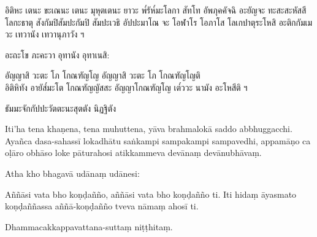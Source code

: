 \documentclass[
  babelLanguage=thai,
  final,
]{chantingbook}
\begin{document}
\clearpage

\thaiText
\markboth{\thaiTitle}{\rightmark}

อิติหะ เตนะ ขะเณนะ เตนะ มุหุตเตนะ ยาวะ พ๎รัห๎มะโลกา สัทโท อัพภุคคัจฉิ 
อะยัญจะ ทะสะสะหัสสี โลกะธาตุ สังกัมปิสัมปะกัมปิ สัมปะเวธิ 
อัปปะมาโณ จะ โอฬาโร โอภาโส โลเกปาตุระโหสิ อะติกกัมเมวะ เทวานัง เทวานุภาวัง ฯ

อะถะโข ภะคะวา อุทานัง อุทาเนสิ:

อัญญาสิ วะตะ โภ โกณฑัญโญ อัญญาสิ วะตะ โภ โกณฑัญโญติ \\
อิติหิทัง อายัส๎มะโต โกณฑัญญัสสะ อัญญาโกณฑัญโญ เต๎ววะ นามัง อะโหสีติ ฯ 

ธัมมะจักกัปปะวัตตะนะสุตตัง นิฏฐิตัง

\clearpage

\paliText
\markboth{\paliTitle}{\rightmark}

Iti'ha tena khaṇena, tena muhuttena, yāva brahmalokā saddo abbhuggacchi.
Ayañca dasa-sahassī lokadhātu saṅkampi sampakampi sampavedhi, appamāṇo ca
oḷāro obhāso loke pāturahosi atikkammeva devānaṃ devānubhāvaṃ.

Atha kho bhagavā udānaṃ udānesi:

Aññāsi vata bho koṇḍañño, aññāsi vata bho koṇḍañño ti. Iti hidaṃ āyasmato
koṇḍaññassa aññā-koṇḍañño tveva nāmaṃ ahosī ti.

Dhammacakkappavattana-suttaṃ niṭṭhitaṃ.
\end{document}
